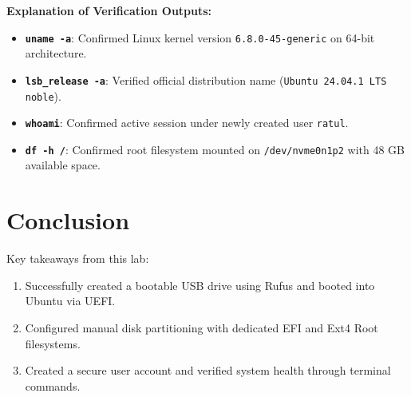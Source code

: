 \documentclass[10pt,a4paper,portrait]{article}
\newcommand{\cmd}[1]{\texttt{\textbf{#1}}}
\begin{document}
\vspace{2pt}\noindent\textbf{Explanation of Verification Outputs:}\par\vspace{1pt}
\begin{itemize}[noitemsep,topsep=1pt,leftmargin=1.2em]
  \item \cmd{uname -a}: Confirmed Linux kernel version \texttt{6.8.0-45-generic} on 64-bit architecture.
  \item \cmd{lsb\_release -a}: Verified official distribution name (\texttt{Ubuntu 24.04.1 LTS noble}).
  \item \cmd{whoami}: Confirmed active session under newly created user \texttt{ratul}.
  \item \cmd{df -h /}: Confirmed root filesystem mounted on \texttt{/dev/nvme0n1p2} with 48 GB available space.
\end{itemize}

\section{Conclusion}
Key takeaways from this lab:
\begin{enumerate}[noitemsep,topsep=1pt,leftmargin=1.4em]
  \item Successfully created a bootable USB drive using Rufus and booted into Ubuntu via UEFI.
  \item Configured manual disk partitioning with dedicated EFI and Ext4 Root filesystems.
  \item Created a secure user account and verified system health through terminal commands.
\end{enumerate}
\end{document}
